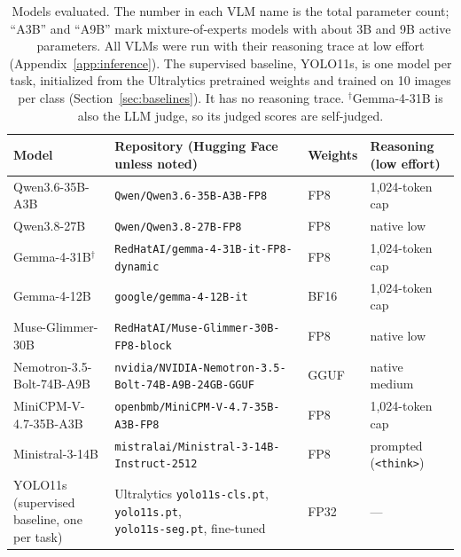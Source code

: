 \documentclass[10pt,letterpaper]{article}
\newcommand{\tablefont}{\footnotesize}
\newcommand{\code}[1]{\texttt{#1}}
\begin{document}
\begin{table}[!tbp]
\centering
\caption{Models evaluated. The number in each VLM name is the total parameter count; ``A3B'' and ``A9B'' mark mixture-of-experts models with about 3B and 9B active parameters. All VLMs were run with their reasoning trace at low effort (Appendix~\ref{app:inference}). The supervised baseline, YOLO11s, is one model per task, initialized from the Ultralytics pretrained weights and trained on 10 images per class (Section~\ref{sec:baselines}). It has no reasoning trace. $^\dagger$Gemma-4-31B is also the LLM judge, so its judged scores are self-judged.}
\label{tab:models}
\renewcommand{\arraystretch}{1.15}
\tablefont
\setlength{\tabcolsep}{5pt}
\begin{tabular}{llll}
\toprule
\textbf{Model} & \textbf{Repository (Hugging Face unless noted)} & \textbf{Weights} & \makecell[l]{\textbf{Reasoning}\\\textbf{(low effort)}} \\
\midrule
Qwen3.6-35B-A3B & \code{Qwen/Qwen3.6-35B-A3B-FP8} & FP8 & 1,024-token cap \\
Qwen3.8-27B & \code{Qwen/Qwen3.8-27B-FP8} & FP8 & native low \\
Gemma-4-31B$^\dagger$ & \code{RedHatAI/gemma-4-31B-it-FP8-dynamic} & FP8 & 1,024-token cap \\
Gemma-4-12B & \code{google/gemma-4-12B-it} & BF16 & 1,024-token cap \\
Muse-Glimmer-30B & \code{RedHatAI/Muse-Glimmer-30B-FP8-block} & FP8 & native low \\
Nemotron-3.5-Bolt-74B-A9B & \code{nvidia/NVIDIA-Nemotron-3.5-Bolt-74B-A9B-24GB-GGUF} & GGUF & native medium \\
MiniCPM-V-4.7-35B-A3B & \code{openbmb/MiniCPM-V-4.7-35B-A3B-FP8} & FP8 & 1,024-token cap \\
Ministral-3-14B & \code{mistralai/Ministral-3-14B-Instruct-2512} & FP8 & prompted (\code{<think>}) \\
\midrule
\makecell[l]{YOLO11s (supervised\\baseline, one per task)} & \makecell[l]{Ultralytics \code{yolo11s-cls.pt}, \code{yolo11s.pt},\\\code{yolo11s-seg.pt}, fine-tuned} & FP32 & --- \\
\bottomrule
\end{tabular}
\end{table}
\end{document}
